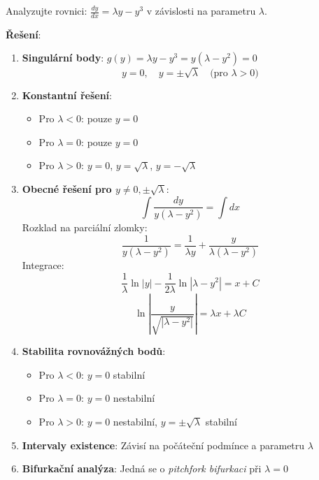 \begin{example}
    Analyzujte rovnici: $\frac{dy}{dx} = \lambda y - y^3$ v závislosti na parametru $\lambda$.
    \vspace{0.3\baselineskip}
    
    \textbf{Řešení}: 
    \begin{enumerate}
    \item \textbf{Singulární body}: $g(y) = \lambda y - y^3 = y(\lambda - y^2) = 0$
    \[
    y = 0, \quad y = \pm\sqrt{\lambda} \quad \text{(pro $\lambda > 0$)}
    \]
    
    \item \textbf{Konstantní řešení}:
    \begin{itemize}
    \item Pro $\lambda < 0$: pouze $y = 0$
    \item Pro $\lambda = 0$: pouze $y = 0$  
    \item Pro $\lambda > 0$: $y = 0$, $y = \sqrt{\lambda}$, $y = -\sqrt{\lambda}$
    \end{itemize}
    
    \item \textbf{Obecné řešení pro $y \neq 0, \pm\sqrt{\lambda}$}:
    \[
    \int \frac{dy}{y(\lambda - y^2)} = \int dx
    \]
    Rozklad na parciální zlomky:
    \[
    \frac{1}{y(\lambda - y^2)} = \frac{1}{\lambda y} + \frac{y}{\lambda(\lambda - y^2)}
    \]
    Integrace:
    \[
    \frac{1}{\lambda} \ln|y| - \frac{1}{2\lambda} \ln|\lambda - y^2| = x + C
    \]
    \[
    \ln\left|\frac{y}{\sqrt{|\lambda - y^2|}}\right| = \lambda x + \lambda C
    \]
    
    \item \textbf{Stabilita rovnovážných bodů}:
    \begin{itemize}
    \item Pro $\lambda < 0$: $y = 0$ stabilní
    \item Pro $\lambda = 0$: $y = 0$ nestabilní
    \item Pro $\lambda > 0$: $y = 0$ nestabilní, $y = \pm\sqrt{\lambda}$ stabilní
    \end{itemize}
    
    \item \textbf{Intervaly existence}: Závisí na počáteční podmínce a parametru $\lambda$
    
    \item \textbf{Bifurkační analýza}: Jedná se o \emph{pitchfork bifurkaci} při $\lambda = 0$
    \end{enumerate}
    \end{example}

